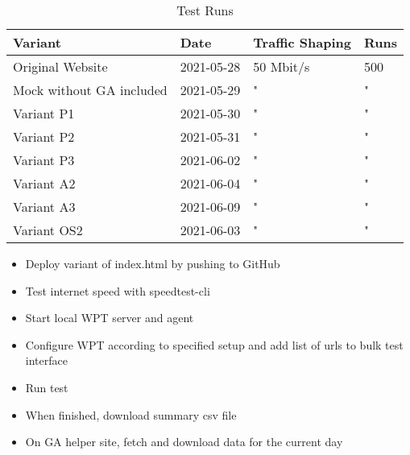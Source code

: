 \begin{table}[h]
	\small
	\centering
	\begin{tabular}{ | l | l | l | l | } 
	 \hline
	  Variant \cellcolor{lightgrey} &  Date \cellcolor{lightgrey} & Traffic Shaping \cellcolor{lightgrey} & Runs \cellcolor{lightgrey} \\
	  \hline
	  Original Website & 2021-05-28 & 50 Mbit/s & 500 \\
	  Mock without GA included & 2021-05-29 & " & " \\
	  \hline
	  Variant P1 & 2021-05-30 & " & " \\
	  Variant P2 & 2021-05-31 & " & " \\
	  Variant P3 & 2021-06-02 & " & " \\
	  \hline
	  Variant A2 & 2021-06-04 & " & " \\
	  Variant A3 & 2021-06-09 & " & " \\
	  \hline
	  Variant OS2 & 2021-06-03 & " & " \\
	  \hline
	  \end{tabular}
	\medskip
	\caption{Test Runs}
	\label{table:test_runs}
\end{table}



\begin{itemize}
\item Deploy variant of index.html by pushing to GitHub
\item Test internet speed with speedtest-cli
\item Start local WPT server and agent
\item Configure WPT according to specified setup and add list of urls to bulk test interface
\item Run test
\item When finished, download summary csv file
\item On GA helper site, fetch and download data for the current day
\end{itemize}








